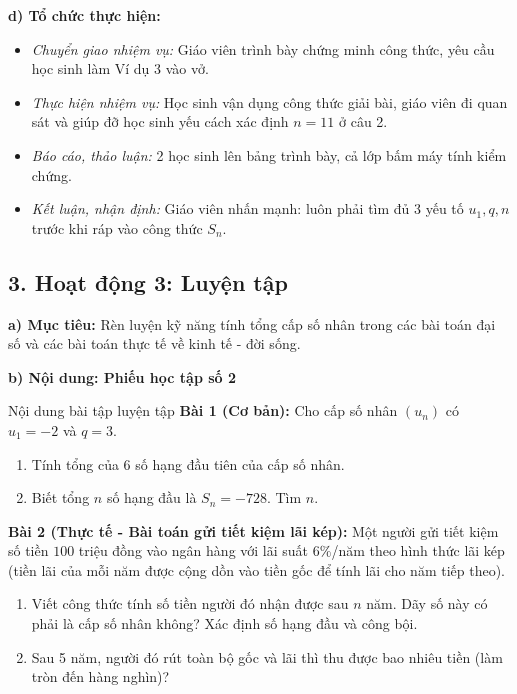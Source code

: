 \documentclass[12pt, a4paper]{article}
\begin{document}
\noindent \textbf{d) Tổ chức thực hiện:}
\begin{itemize}[leftmargin=0.8cm]
    \item \textit{Chuyển giao nhiệm vụ:} Giáo viên trình bày chứng minh công thức, yêu cầu học sinh làm Ví dụ 3 vào vở.
    \item \textit{Thực hiện nhiệm vụ:} Học sinh vận dụng công thức giải bài, giáo viên đi quan sát và giúp đỡ học sinh yếu cách xác định $n = 11$ ở câu 2.
    \item \textit{Báo cáo, thảo luận:} 2 học sinh lên bảng trình bày, cả lớp bấm máy tính kiểm chứng.
    \item \textit{Kết luận, nhận định:} Giáo viên nhấn mạnh: luôn phải tìm đủ 3 yếu tố $u_1, q, n$ trước khi ráp vào công thức $S_n$.
\end{itemize}

\subsection*{3. Hoạt động 3: Luyện tập}

\noindent \textbf{a) Mục tiêu:}
Rèn luyện kỹ năng tính tổng cấp số nhân trong các bài toán đại số và các bài toán thực tế về kinh tế - đời sống.

\noindent \textbf{b) Nội dung: Phiếu học tập số 2}
\begin{pedabox}{Nội dung bài tập luyện tập}
\textbf{Bài 1 (Cơ bản):} Cho cấp số nhân $(u_n)$ có $u_1 = -2$ và $q = 3$.
\begin{enumerate}[leftmargin=0.6cm]
    \item Tính tổng của 6 số hạng đầu tiên của cấp số nhân.
    \item Biết tổng $n$ số hạng đầu là $S_n = -728$. Tìm $n$.
\end{enumerate}
\textbf{Bài 2 (Thực tế - Bài toán gửi tiết kiệm lãi kép):}
Một người gửi tiết kiệm số tiền $100$ triệu đồng vào ngân hàng với lãi suất $6\%$/năm theo hình thức lãi kép (tiền lãi của mỗi năm được cộng dồn vào tiền gốc để tính lãi cho năm tiếp theo).
\begin{enumerate}[leftmargin=0.6cm]
    \item Viết công thức tính số tiền người đó nhận được sau $n$ năm. Dãy số này có phải là cấp số nhân không? Xác định số hạng đầu và công bội.
    \item Sau 5 năm, người đó rút toàn bộ gốc và lãi thì thu được bao nhiêu tiền (làm tròn đến hàng nghìn)?
\end{enumerate}
\end{pedabox}
\end{document}
